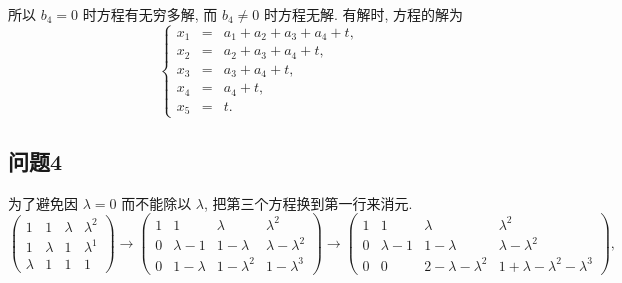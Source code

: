 所以 $b_4 = 0$ 时方程有无穷多解, 而 $b_4 \not= 0$ 时方程无解. 有解时, 方程的解为
\[
    \left\{
    \begin{aligned}
    x_1 &{}={} & a_1 + a_2 + a_3 + a_4 + t, \\
    x_2 &{}={} & a_2 + a_3 + a_4 + t, \\
    x_3 &{}={} & a_3 + a_4 + t, \\
    x_4 &{}={} & a_4 + t, \\
    x_5 &{}={} & t. 
    \end{aligned}
    \right.
\]

\newpage
\subsection*{问题4}

为了避免因 $\lambda = 0$ 而不能除以 $\lambda$, 把第三个方程换到第一行来消元.
\[
\left(
\begin{array}{ccc|c}
    1 & 1 & \lambda & \lambda^2 \\
    1 & \lambda & 1 & \lambda^1 \\
    \lambda & 1 & 1 & 1
\end{array}
\right)
\to 
\left(
\begin{array}{ccc|c}
    1 & 1 & \lambda & \lambda^2 \\
    0 & \lambda - 1 & 1 - \lambda & \lambda - \lambda^2 \\
    0 & 1 - \lambda & 1 - \lambda^2 & 1 - \lambda^3
\end{array}
\right)
\to 
\left(
\begin{array}{ccc|c}
    1 & 1 & \lambda & \lambda^2 \\
    0 & \lambda - 1 & 1 - \lambda & \lambda - \lambda^2 \\
    0 & 0 & 2 - \lambda - \lambda^2 & 1 + \lambda - \lambda^2 - \lambda^3
\end{array}
\right),
\]

